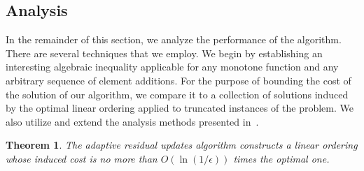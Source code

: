 \documentclass[11pt]{article}
\theoremstyle{plain}
\newtheorem{theorem}{Theorem}[section]
\theoremstyle{definition}
\begin{document}
\subsection{Analysis} \label{subsec:Analysis}

In the remainder of this section, we analyze the performance of
the algorithm. There are several techniques that we employ. We
begin by establishing an interesting algebraic inequality
applicable for any monotone function and any arbitrary sequence of
element additions. For the purpose of bounding the cost of the
solution of our algorithm, we compare it to a collection of
solutions induced by the optimal linear ordering applied to
truncated instances of the problem. We also utilize and extend the
analysis methods presented in~\cite{FeigeLT04,AzarGY09}.

\begin{theorem} \label{thm:Approx}
The adaptive residual updates algorithm constructs a linear
ordering whose induced cost is no more than $O(\ln(1 / \epsilon))$
times the optimal one.
\end{theorem}
\end{document}
